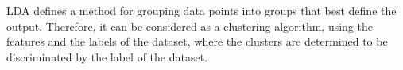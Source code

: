 \tftrue 

LDA defines a method for grouping data points into groups that best define the output. Therefore, it can be considered as a clustering algorithm, using the features and the labels of the dataset, where the clusters are determined to be discriminated by the label of the dataset.